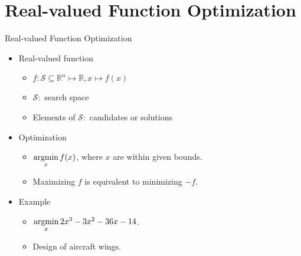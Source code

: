 \newcommand{\argmin}{\operatornamewithlimits{argmin}}

\section{Real-valued Function Optimization}

\begin{frame}{Real-valued Function Optimization}
  \begin{itemize}
    \item{Real-valued function}
      \begin{itemize}
        \item $f \colon \mathcal{S} \subseteq \mathbb{R}^n \mapsto
          \mathbb{R},x \mapsto f(x)$
        \item $\mathcal{S} \colon $ search space
        \item Elements of $\mathcal{S} \colon $ candidates or solutions
      \end{itemize}
    \item{Optimization}
      \begin{itemize}
        \item $\argmin\limits_{x} f(x)$, where $x$ are within given bounds.
        \item Maximizing $f$ is equivalent to minimizing $-f$.
      \end{itemize}
    \item Example
      \begin{itemize}
        \item $\argmin\limits_x 2x^3-3x^2-36x-14$.
        \item Design of aircraft wings.
      \end{itemize}
  \end{itemize}
\end{frame}

